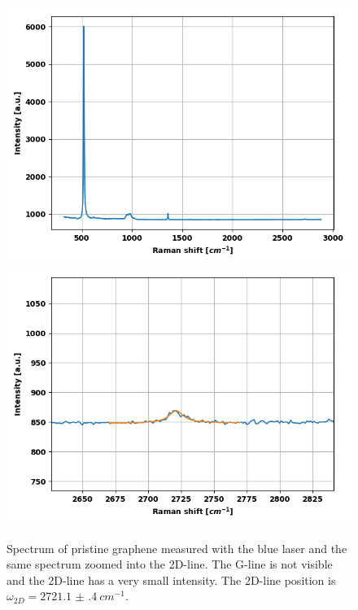 \documentclass[12pt,a4paper]{article}
\begin{document}
\begin{figure}
\centering
\includegraphics[scale=0.5]{Bilder/part6/prestine_spectrum.png}
\includegraphics[scale=0.5]{Bilder/part6/prestine_2D.png}
\caption{Spectrum of pristine graphene measured with the blue laser and the same spectrum zoomed into the 2D-line. The G-line is not visible and the 2D-line has a very small intensity. The 2D-line position is $\omega_{2D} = \SI{2721.1(4)}{cm^{-1}}$.}
\label{fig:pristine}
\end{figure}
\end{document}
